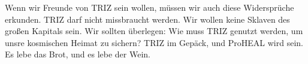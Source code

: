 \documentclass[12pt,a4paper]{article}
\begin{document}
Wenn wir Freunde von TRIZ sein wollen, müssen wir auch diese Widersprüche
erkunden. TRIZ darf nicht missbraucht werden. Wir wollen keine Sklaven des
großen Kapitals sein. Wir sollten überlegen: Wie muss TRIZ genutzt werden, um
unsre kosmischen Heimat zu sichern? TRIZ im Gepäck, und ProHEAL wird sein.  Es
lebe das Brot, und es lebe der Wein.

\ccnotice
\end{document}
